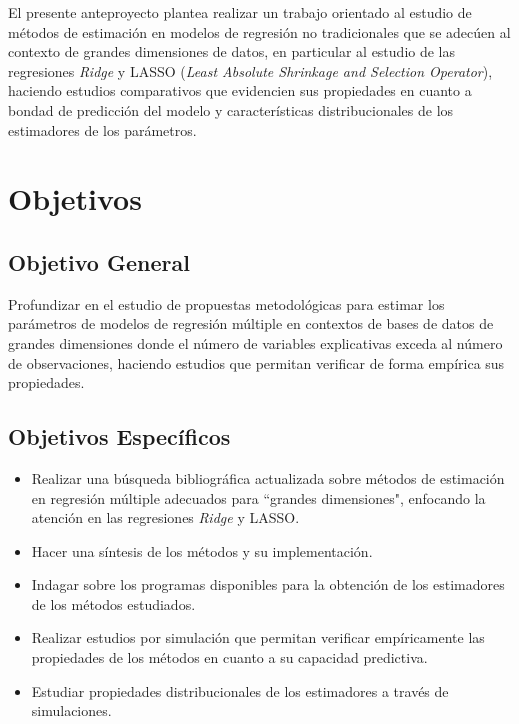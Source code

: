\documentclass[a4paper,12pt]{article}
\begin{document}
El presente anteproyecto plantea realizar un trabajo orientado al estudio de métodos de estimación en modelos de regresión no tradicionales que se adecúen al contexto de grandes dimensiones de datos, en particular al estudio de las regresiones \textit{Ridge} y LASSO (\textit{Least Absolute Shrinkage and Selection Operator}), haciendo estudios comparativos que evidencien sus propiedades en cuanto a bondad de predicción del modelo y características distribucionales de los estimadores de los parámetros.

\section{Objetivos}
\subsection{Objetivo General}
Profundizar en el estudio de propuestas metodológicas para estimar los parámetros de modelos de regresión múltiple en contextos de bases de datos de grandes dimensiones donde el número de variables explicativas exceda al número de observaciones, haciendo estudios que permitan verificar de forma empírica sus propiedades.

\subsection{Objetivos Específicos}
\begin{itemize}
\item Realizar una búsqueda bibliográfica actualizada sobre métodos de estimación en regresión múltiple adecuados para ``grandes dimensiones", enfocando la atención en las regresiones \textit{Ridge} y LASSO.

\item Hacer una síntesis de los métodos y su implementación.

\item Indagar sobre los programas disponibles para la obtención de los estimadores de los métodos estudiados.

\item Realizar estudios por simulación que permitan verificar empíricamente las propiedades de los métodos en cuanto a su capacidad predictiva.

\item Estudiar propiedades distribucionales de los estimadores a través de simulaciones.
\end{itemize}
\end{document}
